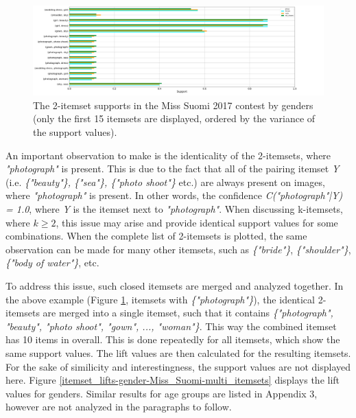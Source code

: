 \begin{figure}[h] 
    \begin{center}
        \includegraphics[width=1.2\textwidth,center]{Images/itemset_supports-gender-Miss_Helsinki-2_itemset.png}
        \caption{The 2-itemset supports in the Miss Suomi 2017 contest by genders (only the first 15 itemsets are displayed, ordered by the variance of the support values).}
        \label{itemset_supports-gender-Miss_Helsinki-2_itemset}
    \end{center}
\end{figure}

An important observation to make is the identicality of the 2-itemsets, where \emph{"photograph"} is present. This is due to the fact that all of the pairing itemset \emph{Y} (i.e. \emph{\{"beauty"\}, \{"sea"\}, \{"photo shoot"\}} etc.) are always present on images, where \emph{"photograph"} is present. In other words, the confidence \emph{C("photograph"|Y) = 1.0}, where \emph{Y} is the itemset next to \emph{"photograph"}. When discussing k-itemsets, where $k \geq 2$, this issue may arise and provide identical support values for some combinations. When the complete list of 2-itemsets is plotted, the same observation can be made for many other itemsets, such as \emph{\{"bride"\}}, \emph{\{"shoulder"\}}, \emph{\{"body of water"\}}, etc. 

To address this issue, such closed itemsets are merged and analyzed together. In the above example (Figure \ref{itemset_supports-gender-Miss_Helsinki-2_itemset}, itemsets with \emph{\{"photograph"\}}), the identical 2-itemsets are merged into a single itemset, such that it contains \emph{\{"photograph", "beauty", "photo shoot", "gown", ..., "woman"\}}. This way the combined itemset has 10 items in overall. This is done repeatedly for all itemsets, which show the same support values. The lift values are then calculated for the resulting itemsets. For the sake of similicity and interestingness, the support values are not displayed here. Figure \ref{itemset_lifts-gender-Miss_Suomi-multi_itemsets} displays the lift values for genders. Similar results for age groups are listed in Appendix 3, however are not analyzed in the paragraphs to follow.

